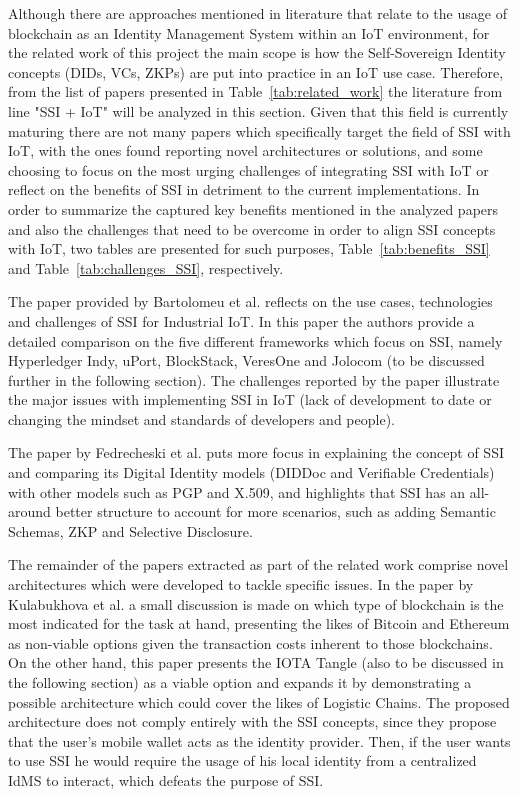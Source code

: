 Although there are approaches mentioned in literature that relate to the usage of blockchain as an Identity Management System within an IoT environment, for the related work of this project the main scope is how the Self-Sovereign Identity concepts (DIDs, VCs, ZKPs) are put into practice in an IoT use case. Therefore, from the list of papers presented in Table~\ref{tab:related_work} the literature from line "SSI + IoT" will be analyzed in this section. Given that this field is currently maturing there are not many papers which specifically target the field of SSI with IoT, with the ones found reporting novel architectures or solutions, and some choosing to focus on the most urging challenges of integrating SSI with IoT or reflect on the benefits of SSI in detriment to the current implementations. In order to summarize the captured key benefits mentioned in the analyzed papers and also the challenges that need to be overcome in order to align SSI concepts with IoT, two tables are presented for such purposes, Table~\ref{tab:benefits_SSI} and Table~\ref{tab:challenges_SSI}, respectively.

The paper provided by Bartolomeu et al. \cite{bartolomeu2019self} reflects on the use cases, technologies and challenges of SSI for Industrial IoT. In this paper the authors provide a detailed comparison on the five different frameworks which focus on SSI, namely Hyperledger Indy, uPort, BlockStack, VeresOne and Jolocom (to be discussed further in the following section). The challenges reported by the paper illustrate the major issues with implementing SSI in IoT (lack of development to date or changing the mindset and standards of developers and people). 

The paper by Fedrecheski et al. \cite{fedrecheski2020self} puts more focus in explaining the concept of SSI and comparing its Digital Identity models (DIDDoc and Verifiable Credentials) with other models such as PGP and X.509, and highlights that SSI has an all-around better structure to account for more scenarios, such as adding Semantic Schemas, ZKP and Selective Disclosure.

The remainder of the papers extracted as part of the related work comprise novel architectures which were developed to tackle specific issues. In the paper by Kulabukhova et al. \cite{kulabukhova2019self} a small discussion is made on which type of blockchain is the most indicated for the task at hand, presenting the likes of Bitcoin and Ethereum as non-viable options given the transaction costs inherent to those blockchains. On the other hand, this paper presents the IOTA Tangle (also to be discussed in the following section) as a viable option and expands it by demonstrating a possible architecture which could cover the likes of Logistic Chains. The proposed architecture does not comply entirely with the SSI concepts, since they propose that the user's mobile wallet acts as the  identity provider. Then, if the user wants to use SSI he would require the usage of his local identity from a centralized IdMS to interact, which defeats the purpose of SSI.

